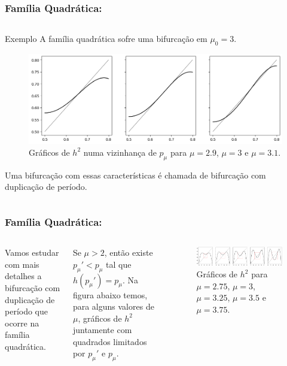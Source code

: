
\begin{frame}
\vspace{5pt}
\frametitle{Família Quadrática: \subsecname}
\begin{columns}
\column{\dimexpr\paperwidth-15pt}

\begin{block}{Exemplo}
A família quadrática sofre uma bifurcação em $\mu_0 = 3$.

\vspace{10pt}

\begin{figure}[!htb]
\centering
\includegraphics[scale=0.4]{images/h_3^2.png}
\caption{Gráficos de $h^2$ numa vizinhança de $p_\mu$ para $\mu = 2.9$, $\mu = 3$ e $\mu = 3.1$.}
\end{figure}
Uma bifurcação com essas características é chamada de bifurcação com duplicação de período.
\end{block}

\end{columns}
\end{frame}


\begin{frame}
\vspace{5pt}
\frametitle{Família Quadrática: \subsecname}
\begin{columns}
\column{\dimexpr\paperwidth-15pt}

Vamos estudar com mais detalhes a bifurcação com duplicação de período que ocorre na família quadrática.

Se $\mu > 2$, então existe $p_\mu' < p_\mu$ tal que $h(p_\mu') = p_\mu$.
Na figura abaixo temos, para alguns valores de $\mu$, gráficos de $h^2$ juntamente com quadrados limitados por $p_\mu'$ e $p_\mu$.

\begin{figure}[!htb]
\centering
\includegraphics[scale=0.375]{images/h^2withboxes.png}
\caption{Gráficos de $h^2$ para $\mu = 2.75$, $\mu = 3$, $\mu = 3.25$, $\mu = 3.5$ e $\mu = 3.75$.}
\label{h^2-and-boxes}
\end{figure}

\end{columns}
\end{frame}

